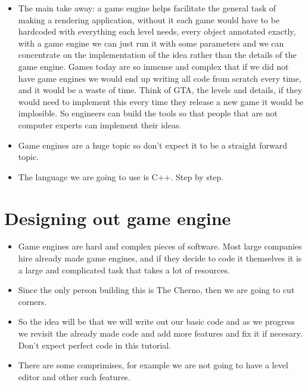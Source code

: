 \begin{itemize}
    \item The main take away: a game engine helps facilitate the general task of making a rendering application, without it each game would have to be hardcoded with everything each level needs, every object annotated exactly, with a game engine we can just run it with some parameters and we can concentrate on the implementation of the idea rather than the details of the game engine. Games today are so inmense and complex that if we did not have game engines we would end up writing all code from scratch every time, and it would be a waste of time. Think of GTA, the levels and details, if they would need to implement this every time they release a new game it would be implosible. So engineers can build the tools so that people that are not computer experts can implement their ideas.
    \item Game engines are a huge topic so don't expect it to be a straight forward topic.
    \item The language we are going to use is C++. Step by step.
\end{itemize}

\section{Designing out game engine}
\begin{itemize}
    \item Game engines are hard and complex pieces of software. Most large companies hire already made game engines, and if they decide to code it themselves it is a large and complicated task that takes a lot of resources.
    \item Since the only person building this is The Cherno, then we are going to cut corners.
    \item So the idea will be that we will write out our basic code and as we progress we revisit the already made code and add more features and fix it if necesary. Don't expect perfect code in this tutorial.
    \item There are some comprimises, for example we are not going to have a level editor and other such features.
\end{itemize}

